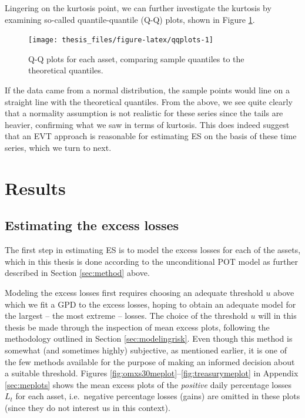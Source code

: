 \documentclass[a4paper,11pt]{article}
\theoremstyle{definition}
\theoremstyle{definition}
\theoremstyle{definition}
\theoremstyle{definition}
\theoremstyle{remark}
\begin{document}
Lingering on the kurtosis point, we can further investigate the kurtosis by examining so-called quantile-quantile (Q-Q) plots, shown in Figure \ref{fig:qqplots}.
\begin{figure}[H]

{\centering \texttt{[image: thesis\_files/figure-latex/qqplots-1]} 

}

\caption{Q-Q plots for each asset, comparing sample quantiles to the theoretical quantiles.}\label{fig:qqplots}
\end{figure}
If the data came from a normal distribution, the sample points would line on a straight line with the theoretical quantiles. From the above, we see quite clearly that a normality assumption is not realistic for these series since the tails are heavier, confirming what we saw in terms of kurtosis. This does indeed suggest that an EVT approach is reasonable for estimating ES on the basis of these time series, which we turn to next.

\newpage

\hypertarget{sec:results}{%
\section{Results}\label{sec:results}}

\hypertarget{estimating-the-excess-losses}{%
\subsection{Estimating the excess losses}\label{estimating-the-excess-losses}}

The first step in estimating ES is to model the excess losses for each of the assets, which in this thesis is done according to the unconditional POT model as further described in Section \ref{sec:method} above.

Modeling the excess losses first requires choosing an adequate threshold \(u\) above which we fit a GPD to the excess losses, hoping to obtain an adequate model for the largest -- the most extreme -- losses. The choice of the threshold \(u\) will in this thesis be made through the inspection of mean excess plots, following the methodology outlined in Section \ref{sec:modelingrisk}. Even though this method is somewhat (and sometimes highly) subjective, as mentioned earlier, it is one of the few methods available for the purpose of making an informed decision about a suitable threshold. Figures \ref{fig:omxs30meplot}--\ref{fig:treasurymeplot} in Appendix \ref{sec:meplots} shows the mean excess plots of the \emph{positive} daily percentage losses \(L_t\) for each asset, i.e.~negative percentage losses (gains) are omitted in these plots (since they do not interest us in this context).
\end{document}
